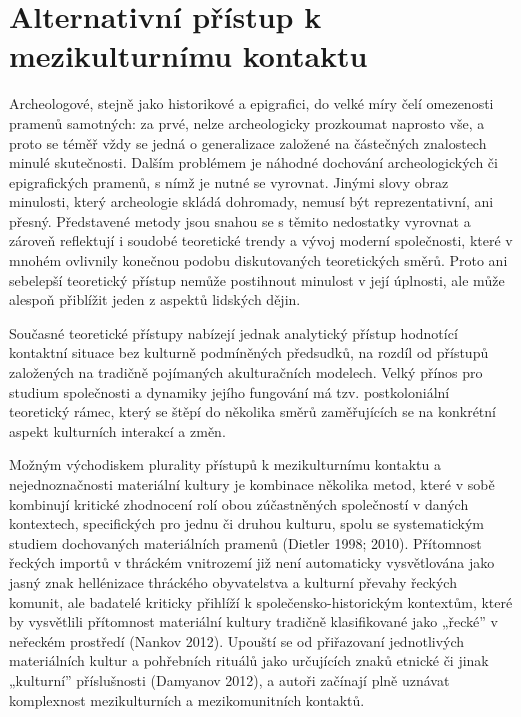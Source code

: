 
\section[alternativní-přístup-k-mezikulturnímu-kontaktu]{Alternativní přístup k mezikulturnímu kontaktu}

Archeologové, stejně jako historikové a epigrafici, do velké míry čelí omezenosti pramenů samotných: za prvé, nelze archeologicky prozkoumat naprosto vše, a proto se téměř vždy se jedná o generalizace založené na částečných znalostech minulé skutečnosti. Dalším problémem je náhodné dochování archeologických či epigrafických pramenů, s nímž je nutné se vyrovnat. Jinými slovy obraz minulosti, který archeologie skládá dohromady, nemusí být reprezentativní, ani přesný. Představené metody jsou snahou se s těmito nedostatky vyrovnat a zároveň reflektují i soudobé teoretické trendy a vývoj moderní společnosti, které v mnohém ovlivnily konečnou podobu diskutovaných teoretických směrů. Proto ani sebelepší teoretický přístup nemůže postihnout minulost v její úplnosti, ale může alespoň přiblížit jeden z aspektů lidských dějin.

Současné teoretické přístupy nabízejí jednak analytický přístup hodnotící kontaktní situace bez kulturně podmíněných předsudků, na rozdíl od přístupů založených na tradičně pojímaných akulturačních modelech. Velký přínos pro studium společnosti a dynamiky jejího fungování má tzv. postkoloniální teoretický rámec, který se štěpí do několika směrů zaměřujících se na konkrétní aspekt kulturních interakcí a změn.

Možným východiskem plurality přístupů k mezikulturnímu kontaktu a nejednoznačnosti materiální kultury je kombinace několika metod, které v sobě kombinují kritické zhodnocení rolí obou zúčastněných společností v daných kontextech, specifických pro jednu či druhou kulturu, spolu se systematickým studiem dochovaných materiálních pramenů (Dietler 1998; 2010). Přítomnost řeckých importů v thráckém vnitrozemí již není automaticky vysvětlována jako jasný znak hellénizace thráckého obyvatelstva a kulturní převahy řeckých komunit, ale badatelé kriticky přihlíží k společensko-historickým kontextům, které by vysvětlili přítomnost materiální kultury tradičně klasifikované jako „řecké” v neřeckém prostředí (Nankov 2012). Upouští se od přiřazovaní jednotlivých materiálních kultur a pohřebních rituálů jako určujících znaků etnické či jinak „kulturní” příslušnosti (Damyanov 2012), a autoři začínají plně uznávat komplexnost mezikulturních a mezikomunitních kontaktů.

